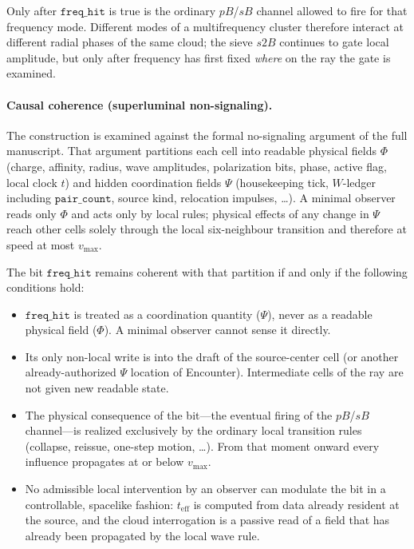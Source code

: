 \documentclass[a4paper]{article}
\begin{document}
Only after $\texttt{freq\_hit}$ is true is the ordinary $pB$/$sB$ channel allowed to fire for that frequency mode. Different modes of a multifrequency cluster therefore interact at different radial phases of the same cloud; the sieve $s2B$ continues to gate local amplitude, but only after frequency has first fixed \emph{where} on the ray the gate is examined.

\paragraph{Causal coherence (superluminal non-signaling).}
The construction is examined against the formal no-signaling argument of the full manuscript. That argument partitions each cell into readable physical fields $\Phi$ (charge, affinity, radius, wave amplitudes, polarization bits, phase, active flag, local clock $t$) and hidden coordination fields $\Psi$ (housekeeping tick, $W$-ledger including $\texttt{pair\_count}$, source kind, relocation impulses, \ldots). A minimal observer reads only $\Phi$ and acts only by local rules; physical effects of any change in $\Psi$ reach other cells solely through the local six-neighbour transition and therefore at speed at most $v_{\max}$.

The bit $\texttt{freq\_hit}$ remains coherent with that partition if and only if the following conditions hold:

\begin{itemize}
\item $\texttt{freq\_hit}$ is treated as a coordination quantity ($\Psi$), never as a readable physical field ($\Phi$). A minimal observer cannot sense it directly.
\item Its only non-local write is into the draft of the source-center cell (or another already-authorized $\Psi$ location of Encounter). Intermediate cells of the ray are not given new readable state.
\item The physical consequence of the bit---the eventual firing of the $pB$/$sB$ channel---is realized exclusively by the ordinary local transition rules (collapse, reissue, one-step motion, \ldots). From that moment onward every influence propagates at or below $v_{\max}$.
\item No admissible local intervention by an observer can modulate the bit in a controllable, spacelike fashion: $t_{\mathrm{eff}}$ is computed from data already resident at the source, and the cloud interrogation is a passive read of a field that has already been propagated by the local wave rule.
\end{itemize}
\end{document}

